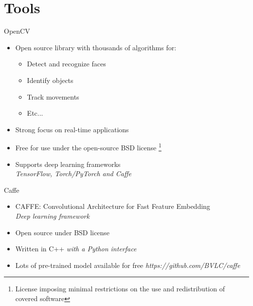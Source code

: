 \documentclass{beamer}
\begin{document}
\section{Tools}
\begin{frame}{OpenCV}
    \begin{itemize}
        \item Open source library with thousands of algorithms for:
        \begin{itemize}
            \item Detect and recognize faces
            \item Identify objects
            \item Track movements
            \item Etc...
        \end{itemize}
        \item Strong focus on real-time applications
        \item Free for use under the open-source BSD license \footnote{License imposing minimal restrictions on the use and redistribution of covered software}
        \item Supports deep learning frameworks \\
            \hspace{0.27cm}\textit{TensorFlow, Torch/PyTorch and Caffe}
    \end{itemize}
\end{frame}

\begin{frame}{Caffe}
    \begin{itemize}
        \item CAFFE: Convolutional Architecture for Fast Feature Embedding  \\
            \hspace{0.27cm}\textit{Deep learning framework}
        \item Open source under BSD license
        \item Written in C++
            \hspace{0.27cm}\textit{with a Python interface}
        \item Lots of pre-trained model available for free
            \hspace{0.27cm}\textit{https://github.com/BVLC/caffe}
    \end{itemize}
\end{frame}
\end{document}
